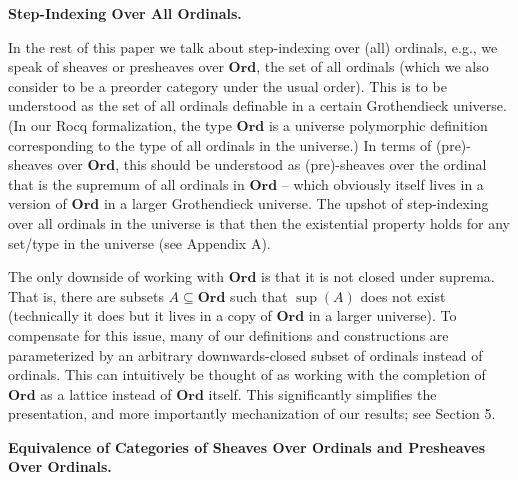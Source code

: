  
 
 
\par\medskip\noindent\textbf{Step-Indexing Over All Ordinals.}\par
 
 
In the rest of this paper we talk about step-indexing over (all) ordinals, e.g., we speak of sheaves or presheaves over $\mathbf{Ord}$, the set of all ordinals (which we also consider to be a preorder category under the usual order). This is to be understood as the set of all ordinals definable in a certain Grothendieck universe. (In our Rocq formalization, the type $\mathbf{Ord}$ is a universe polymorphic definition corresponding to the type of all ordinals in the universe.) In terms of (pre)-sheaves over $\mathbf{Ord}$, this should be understood as (pre)-sheaves over the ordinal that is the supremum of all ordinals in $\mathbf{Ord}$ – which obviously itself lives in a version of $\mathbf{Ord}$ in a larger Grothendieck universe. The upshot of step-indexing over all ordinals in the universe is that then the existential property holds for any set/type in the universe (see Appendix A).\par
 
 
 
The only downside of working with $\mathbf{Ord}$ is that it is not closed under suprema. That is, there are subsets $A\subseteq\mathbf{Ord}$ such that $\sup(A)$ does not exist (technically it does but it lives in a copy of $\mathbf{Ord}$ in a larger universe). To compensate for this issue, many of our definitions and constructions are parameterized by an arbitrary downwards-closed subset of ordinals instead of ordinals. This can intuitively be thought of as working with the completion of $\mathbf{Ord}$ as a lattice instead of $\mathbf{Ord}$ itself. This significantly simplifies the presentation, and more importantly mechanization of our results; see Section 5.\par
 
 
 
 
\par\medskip\noindent\textbf{Equivalence of Categories of Sheaves Over Ordinals and Presheaves Over Ordinals.}\par
 
